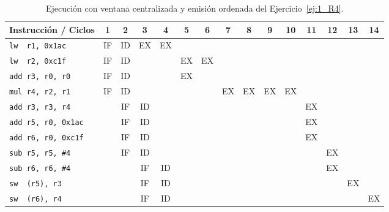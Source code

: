 \begin{ejercicio}
\begin{table}
\centering
\scriptsize
\begin{tabular}{|l|c|c|c|c|c|c|c|c|c|c|c|c|c|c|}
    \hline
    Instrucción / Ciclos & 1 & 2 & 3 & 4 & 5 & 6 & 7 & 8 & 9 & 10 & 11 & 12  & 13 & 14 \\
    \hline
    \verb|lw  r1, 0x1ac|     & IF & ID & EX & EX & & & & & & & & & & \\
    \hline        
    \verb|lw  r2, 0xc1f|     & IF & ID & & & EX & EX & & & & & & & & \\
    \hline           
    \verb|add r3, r0, r0|    & IF & ID & & & EX & & & & & & & & & \\
    \hline                        
    \verb|mul r4, r2, r1|    & IF & ID & & & & & EX & EX & EX & EX & & & & \\
    \hline            
    \verb|add r3, r3, r4|    & & IF & ID & & & & & & & & EX & & & \\
    \hline            
    \verb|add r5, r0, 0x1ac| & & IF & ID & & & & & & & & EX & & & \\
    \hline            
    \verb|add r6, r0, 0xc1f| & & IF & ID & & & & & & & & EX & & & \\
    \hline        
    \verb|sub r5, r5, #4|    & & IF & ID & & & & & & & & & EX & & \\
    \hline
    \verb|sub r6, r6, #4|    & & & IF & ID & & & & & & & & EX & & \\
    \hline
    \verb|sw  (r5), r3|      & & & IF & ID & & & & & & & & & EX & \\
    \hline          
    \verb|sw  (r6), r4|      & & & IF & ID & & & & & & & & & & EX \\
    \hline
\end{tabular}
\caption{Ejecución con ventana centralizada y emisión ordenada del Ejercicio~\ref{ej:1_R4}.}
\label{tab:ej1_R4_1}
\end{table}


\end{ejercicio}
